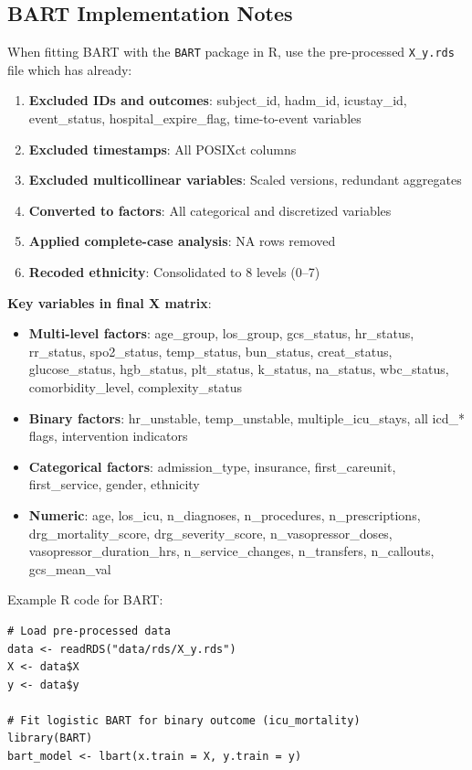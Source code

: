 \documentclass[11pt]{article}
\begin{document}
\subsection{BART Implementation Notes}

When fitting BART with the \texttt{BART} package in R, use the pre-processed \texttt{X\_y.rds} file which has already:

\begin{enumerate}[leftmargin=*, nosep]
    \item \textbf{Excluded IDs and outcomes}: subject\_id, hadm\_id, icustay\_id, event\_status, hospital\_expire\_flag, time-to-event variables
    \item \textbf{Excluded timestamps}: All POSIXct columns
    \item \textbf{Excluded multicollinear variables}: Scaled versions, redundant aggregates
    \item \textbf{Converted to factors}: All categorical and discretized variables
    \item \textbf{Applied complete-case analysis}: NA rows removed
    \item \textbf{Recoded ethnicity}: Consolidated to 8 levels (0--7)
\end{enumerate}

\textbf{Key variables in final X matrix}:
\begin{itemize}[leftmargin=*, nosep]
    \item \textbf{Multi-level factors}: age\_group, los\_group, gcs\_status, hr\_status, rr\_status, spo2\_status, temp\_status, bun\_status, creat\_status, glucose\_status, hgb\_status, plt\_status, k\_status, na\_status, wbc\_status, comorbidity\_level, complexity\_status
    \item \textbf{Binary factors}: hr\_unstable, temp\_unstable, multiple\_icu\_stays, all icd\_* flags, intervention indicators
    \item \textbf{Categorical factors}: admission\_type, insurance, first\_careunit, first\_service, gender, ethnicity
    \item \textbf{Numeric}: age, los\_icu, n\_diagnoses, n\_procedures, n\_prescriptions, drg\_mortality\_score, drg\_severity\_score, n\_vasopressor\_doses, vasopressor\_duration\_hrs, n\_service\_changes, n\_transfers, n\_callouts, gcs\_mean\_val
\end{itemize}

Example R code for BART:
\begin{verbatim}
# Load pre-processed data
data <- readRDS("data/rds/X_y.rds")
X <- data$X
y <- data$y

# Fit logistic BART for binary outcome (icu_mortality)
library(BART)
bart_model <- lbart(x.train = X, y.train = y)
\end{verbatim}
\end{document}
